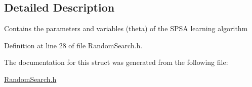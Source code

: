 \subsection{Detailed Description}
Contains the parameters and variables (theta) of the SPSA learning algorithm 

Definition at line 28 of file RandomSearch.h.



The documentation for this struct was generated from the following file:\begin{DoxyCompactItemize}
\item 
\hyperlink{RandomSearch_8h}{RandomSearch.h}\end{DoxyCompactItemize}
